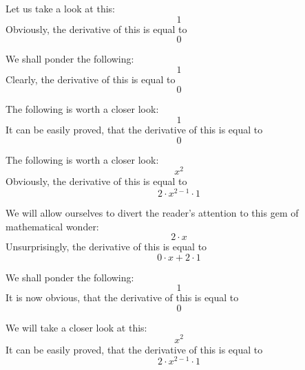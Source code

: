 \documentclass{article}
\begin{document}
Let us take a look at this:
\begin{equation}
1 
\end{equation}
Obviously, the derivative of this is equal to
\begin{equation}
0 
\end{equation}

We shall ponder the following:
\begin{equation}
1 
\end{equation}
Clearly, the derivative of this is equal to
\begin{equation}
0 
\end{equation}

The following is worth a closer look:
\begin{equation}
1 
\end{equation}
It can be easily proved, that the derivative of this is equal to
\begin{equation}
0 
\end{equation}

The following is worth a closer look:
\begin{equation}
x ^{2 } 
\end{equation}
Obviously, the derivative of this is equal to
\begin{equation}
2 \cdot x ^{2 - 1 } \cdot 1 
\end{equation}

We will allow ourselves to divert the reader's attention to this gem of mathematical wonder:
\begin{equation}
2 \cdot x 
\end{equation}
Unsurprisingly, the derivative of this is equal to
\begin{equation}
0 \cdot x + 2 \cdot 1 
\end{equation}

We shall ponder the following:
\begin{equation}
1 
\end{equation}
It is now obvious, that the derivative of this is equal to
\begin{equation}
0 
\end{equation}

We will take a closer look at this:
\begin{equation}
x ^{2 } 
\end{equation}
It can be easily proved, that the derivative of this is equal to
\begin{equation}
2 \cdot x ^{2 - 1 } \cdot 1 
\end{equation}
\end{document}
